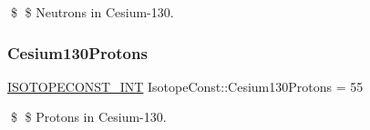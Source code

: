 \$ \$ Neutrons in Cesium-\/130. \mbox{\label{group___isotope_const-_cesium-_cs130_gab1f3e0e5cc0f7aa013fdeda35b40ce39}} 
\subsubsection{\texorpdfstring{Cesium130\+Protons}{Cesium130Protons}}
{\footnotesize\ttfamily \mbox{\hyperlink{group___isotope_const-_macros_ga5f18360b3e99483a35c32d789e62621c}{I\+S\+O\+T\+O\+P\+E\+C\+O\+N\+S\+T\+\_\+\+I\+NT}} Isotope\+Const\+::\+Cesium130\+Protons = 55}

\$ \$ Protons in Cesium-\/130. 